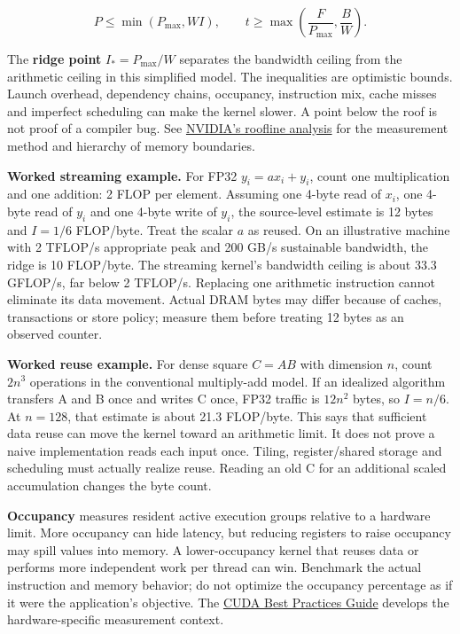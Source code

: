 \[
P\leq\min(P_{\max},WI),\qquad
t\geq\max\left(\frac{F}{P_{\max}},\frac{B}{W}\right).
\]

The \textbf{ridge point} \(I_*=P_{\max}/W\) separates the bandwidth ceiling from the arithmetic ceiling in this simplified model. The inequalities are optimistic bounds. Launch overhead, dependency chains, occupancy, instruction mix, cache misses and imperfect scheduling can make the kernel slower. A point below the roof is not proof of a compiler bug. See \href{https://developer.nvidia.com/blog/accelerating-hpc-applications-with-nsight-compute-roofline-analysis/}{NVIDIA's roofline analysis} for the measurement method and hierarchy of memory boundaries.

\textbf{Worked streaming example.} For FP32 \(y_i=a x_i+y_i\), count one multiplication and one addition: 2 FLOP per element. Assuming one 4-byte read of \(x_i\), one 4-byte read of \(y_i\) and one 4-byte write of \(y_i\), the source-level estimate is 12 bytes and \(I=1/6\) FLOP/byte. Treat the scalar \(a\) as reused. On an illustrative machine with 2 TFLOP/s appropriate peak and 200 GB/s sustainable bandwidth, the ridge is 10 FLOP/byte. The streaming kernel's bandwidth ceiling is about 33.3 GFLOP/s, far below 2 TFLOP/s. Replacing one arithmetic instruction cannot eliminate its data movement. Actual DRAM bytes may differ because of caches, transactions or store policy; measure them before treating 12 bytes as an observed counter.

\textbf{Worked reuse example.} For dense square \(C=AB\) with dimension \(n\), count \(2n^3\) operations in the conventional multiply-add model. If an idealized algorithm transfers A and B once and writes C once, FP32 traffic is \(12n^2\) bytes, so \(I=n/6\). At \(n=128\), that estimate is about 21.3 FLOP/byte. This says that sufficient data reuse can move the kernel toward an arithmetic limit. It does not prove a naive implementation reads each input once. Tiling, register/shared storage and scheduling must actually realize reuse. Reading an old C for an additional scaled accumulation changes the byte count.

\textbf{Occupancy} measures resident active execution groups relative to a hardware limit. More occupancy can hide latency, but reducing registers to raise occupancy may spill values into memory. A lower-occupancy kernel that reuses data or performs more independent work per thread can win. Benchmark the actual instruction and memory behavior; do not optimize the occupancy percentage as if it were the application's objective. The \href{https://docs.nvidia.com/cuda/cuda-c-best-practices-guide/index.html}{CUDA Best Practices Guide} develops the hardware-specific measurement context.

